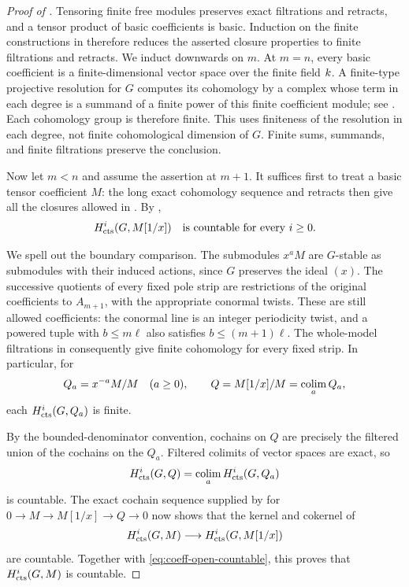 \begin{proof}[Proof of ]
Tensoring finite free modules preserves exact filtrations and retracts,
and a tensor product of basic coefficients is basic. Induction on the
finite constructions in  therefore reduces
the asserted closure properties to finite filtrations and retracts.
We induct downwards on $m$.  At $m=n$, every basic coefficient is a
finite-dimensional vector space over the finite field $k$.  A
finite-type projective resolution for $G$ computes its cohomology by a
complex whose term in each degree is a summand of a finite power of this
finite coefficient module; see .  Each
cohomology group is therefore finite.  This uses finiteness of the
resolution in each degree, not finite cohomological dimension of $G$.
Finite sums, summands, and finite filtrations preserve the conclusion.

Now let $m<n$ and assume the assertion at $m+1$.  It suffices first to
treat a basic tensor coefficient $M$: the long exact cohomology sequence
and retracts then give all the closures allowed in
.  By
,
\begin{equation}\label{eq:coeff-open-countable}
 H^i_{\mathrm{cts}}(G,M[1/x])\quad\text{is countable for every }i\geq0.
\end{equation}

We spell out the boundary comparison.  The submodules $x^aM$ are
$G$-stable as submodules with their induced actions, since $G$ preserves
the ideal $(x)$.  The successive quotients of every fixed pole strip
are restrictions of the original coefficients to $A_{m+1}$, with the
appropriate conormal twists.  These are still allowed coefficients:
the conormal line is an integer periodicity twist, and a powered tuple
with $b\leq m\ell$ also satisfies $b\leq(m+1)\ell$.  The whole-model
filtrations in  consequently
give finite cohomology for every fixed strip.  In particular, for
\[
 Q_a=x^{-a}M/M\quad(a\geq0),\qquad
 Q=M[1/x]/M=\operatorname*{colim}_a Q_a,
\]
each $H^i_{\mathrm{cts}}(G,Q_a)$ is finite.

By the bounded-denominator convention, cochains on $Q$ are precisely
the filtered union of the cochains on the $Q_a$.  Filtered colimits of
vector spaces are exact, so
\[
 H^i_{\mathrm{cts}}(G,Q)=\operatorname*{colim}_a H^i_{\mathrm{cts}}(G,Q_a)
\]
is countable.  The exact cochain sequence supplied by
 for $0\to M\to M[1/x]\to Q\to0$ now shows that the
kernel and cokernel of
\[
 H^i_{\mathrm{cts}}(G,M)\longrightarrow H^i_{\mathrm{cts}}(G,M[1/x])
\]
are countable.  Together with \eqref{eq:coeff-open-countable}, this proves
that $H^i_{\mathrm{cts}}(G,M)$ is countable.


\end{proof}
